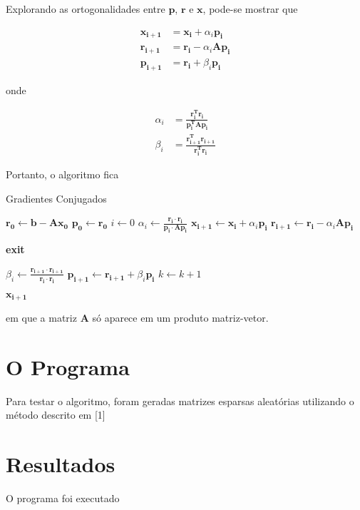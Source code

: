 \documentclass[a4paper,11pt]{article}
\begin{document}
    Explorando as ortogonalidades entre $\mathbf{p}$, $\mathbf{r}$ e $\mathbf{x}$, pode-se mostrar que

    \begin{align*}
        \mathbf{x_{i+1}} &= \mathbf{x_i} + \alpha_i\mathbf{p_i}  \\
        \mathbf{r_{i+1}} &= \mathbf{r_i} - \alpha_i\mathbf{Ap_i} \\
        \mathbf{p_{i+1}} &= \mathbf{r_i} + \beta_i\mathbf{p_i}
    \end{align*}

    onde

    \begin{align*}
        \alpha_i &= \mathbf{\frac{r_i^Tr_i}{p_i^TAp_i}} \\
        \beta_i  &= \mathbf{\frac{r_{i+1}^Tr_{i+1}}{r_i^Tr_i}}
    \end{align*}

    Portanto, o algoritmo fica
    \begin{algorithm}
        \caption{Gradientes Conjugados}
        \begin{algorithmic}[1]
            \State $\mathbf{r_0} \gets \mathbf{b - Ax_0}$
            \State $\mathbf{p_0} \gets \mathbf{r_0}$
            \State $i \gets 0$
            \Loop
                \State $\alpha_i \gets \frac{\mathbf{r_i}\cdot\mathbf{r_i}}{\mathbf{p_i\cdot Ap_i}}$
                \State $\mathbf{x_{i+1}} \gets \mathbf{x_i} + \alpha_i\mathbf{p_i}$
                \State $\mathbf{r_{i+1}} \gets \mathbf{r_i} - \alpha_i\mathbf{Ap_i}$


                    \textbf{exit}
                \EndIf

                \State $\beta_i \gets \frac{\mathbf{r_{i+1}}\cdot\mathbf{r_{i+1}}}{\mathbf{r_i}\cdot\mathbf{r_i}}$
                \State $\mathbf{p_{i+1}} \gets \mathbf{r_{i+1}} + \beta_i\mathbf{p_i}$
                \State $k \gets k + 1$
            \EndLoop

        \Return $\mathbf{x_{i+1}}$

        \end{algorithmic}
    \end{algorithm}

    em que a matriz $\mathbf{A}$ só aparece em um produto matriz-vetor.

    \section*{O Programa}
        Para testar o algoritmo, foram geradas matrizes esparsas aleatórias utilizando o método descrito em [1]
    \section*{Resultados}
        O programa foi executado

\end{document}
